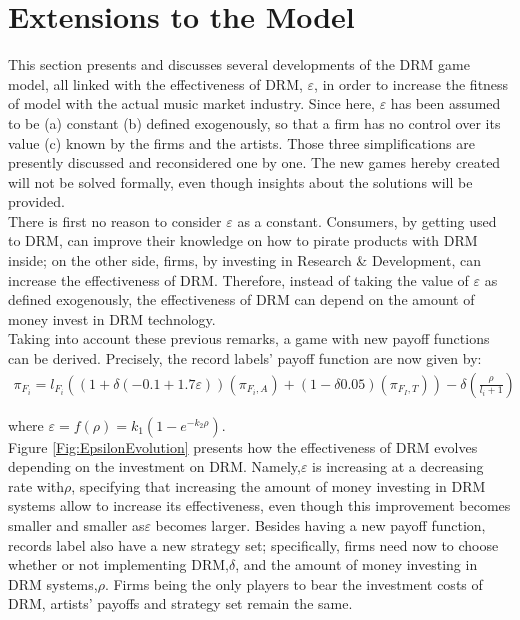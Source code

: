 \documentclass[a4paper,12pt]{article}
\numberwithin{equation}{section}
\begin{document}
\section{Extensions to the Model} \label{Sec:Extensions}

This section presents and discusses several developments of the DRM
game model, all linked with the effectiveness of DRM, $\varepsilon$,
in order to increase the fitness of model with the actual music market
industry. Since here, $\varepsilon$ has been assumed to be (a) constant
(b) defined exogenously, so that a firm has no control over its value
(c) known by the firms and the artists. Those three simplifications
are presently discussed and reconsidered one by one. The new games
hereby created will not be solved formally, even though insights about
the solutions will be provided.\\

There is first no reason to consider $\varepsilon$ as a constant.
Consumers, by getting used to DRM, can improve their knowledge on
how to pirate products with DRM inside; on the other side, firms,
by investing in Research \& Development, can increase the effectiveness
of DRM. Therefore, instead of taking the value of $\varepsilon$ as
defined exogenously, the effectiveness of DRM can depend on the amount
of money invest in DRM technology.\\

Taking into account these previous remarks, a game with new payoff
functions can be derived. Precisely, the record labels’ payoff function
are now given by:
\begin{eqnarray*}
\pi_{F_{i}}=l_{F_{i}}((1+\delta(-0.1+1.7\varepsilon))(\pi_{F_{i},A})+(1-\delta0.05)(\pi_{F_{I},T}))-\delta(\frac{\rho}{l_{i}+1})
\end{eqnarray*}

where $\varepsilon=f(\rho)=k_{1}(1-e^{-k_{2}\rho})$.\\

Figure \ref{Fig:EpsilonEvolution} presents how the effectiveness of DRM evolves depending on
the investment on DRM. Namely,$\varepsilon$ is increasing at a decreasing
rate with$\rho$, specifying that increasing the amount of money investing
in DRM systems allow to increase its effectiveness, even though this
improvement becomes smaller and smaller as$\varepsilon$ becomes larger.
Besides having a new payoff function, records label also have a new
strategy set; specifically, firms need now to choose whether or not
implementing DRM,$\delta$, and the amount of money investing in DRM
systems,$\rho$. Firms being the only players to bear the investment
costs of DRM, artists' payoffs and strategy set remain the same.\\
\end{document}
